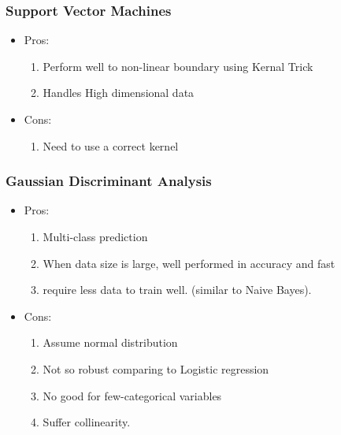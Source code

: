 \documentclass[12pt]{amsart}
\numberwithin{equation}{section}
\theoremstyle{plain}
\theoremstyle{definition}
\begin{document}
\subsubsection{Support Vector Machines}

\begin{itemize}
\item Pros: 

\begin{enumerate}
\item Perform well to non-linear boundary using Kernal Trick
\item Handles High dimensional data
\end{enumerate}

\item Cons:

\begin{enumerate}
\item Need to use a correct kernel
\end{enumerate}

\end{itemize}

\subsubsection{Gaussian Discriminant Analysis}

\begin{itemize}
\item Pros: 

\begin{enumerate}
\item Multi-class prediction
\item When data size is large, well performed in accuracy and fast
\item require less data to train well. (similar to Naive Bayes).
\end{enumerate}

\item Cons:

\begin{enumerate}
\item Assume normal distribution
\item Not so robust comparing to Logistic regression
\item No good for few-categorical variables
\item Suffer collinearity.
\end{enumerate}

\end{itemize}
\end{document}
